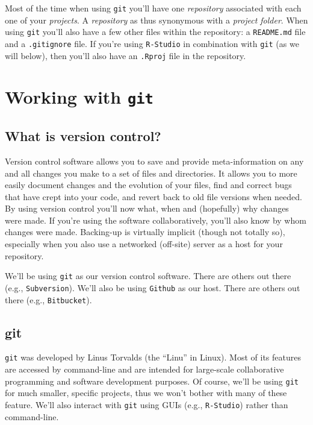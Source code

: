 \documentclass[12pt,letterpaper]{article}
\begin{document}
Most of the time when using \texttt{git} you'll have one \emph{repository} associated with each one of your \emph{projects}.  A \emph{repository} as thus synonymous with a \emph{project folder}.  When using \texttt{git} you'll also have a few other files within the repository: a \texttt{README.md} file and a \texttt{.gitignore} file.  If you're using \texttt{R-Studio} in combination with \texttt{git} (as we will below), then you'll also have an \texttt{.Rproj} file in the repository.

\pagebreak

\section{Working with \texttt{git}}

\subsection{What is version control?}
Version control software allows you to save and provide meta-information on any and all changes you make to a set of files and directories.  It allows you to more easily document changes and the evolution of your files, find and correct bugs that have crept into your code, and revert back to old file versions when needed.  By using version control you'll now what, when and (hopefully) why changes were made.  If you're using the software collaboratively, you'll also know by whom changes were made.  Backing-up is virtually implicit (though not totally so), especially when you also use a networked (off-site) server as a host for your repository.

We'll be using \texttt{git} as our version control software.  There are others out there (e.g., \texttt{Subversion}).  We'll also be using \texttt{Github} as our host.  There are others out there (e.g., \texttt{Bitbucket}).

\subsection{git}
\texttt{git} was developed by Linus Torvalds (the ``Linu'' in Linux).  Most of its features are accessed by command-line and are intended for large-scale collaborative programming and software development purposes.  Of course, we'll be using \texttt{git} for much smaller, specific projects, thus we won't bother with many of these feature.  We'll also interact with \texttt{git} using GUIs (e.g., \texttt{R-Studio}) rather than command-line.  
\end{document}
